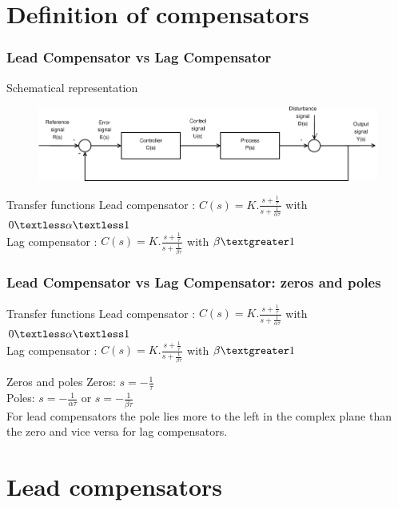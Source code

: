 
\section{Definition of compensators}

\begin{frame}
	\frametitle{Lead Compensator vs Lag Compensator}
	\begin{block}{Schematical representation}
		\begin{figure}
			\centering
			\includegraphics[width=1\linewidth]{Closed-Loop}
		\end{figure}
	\end{block}
	\begin{block}{Transfer functions}
		Lead compensator : 
		$C(s) = K.\frac{s + \frac{1}{\tau}}{s + \frac{1}{\alpha\tau}}$ with $0 \textless  \alpha  \textless  1$ \\
		Lag compensator : 
		$C(s) = K.\frac{s + \frac{1}{\tau}}{s + \frac{1}{\beta\tau}}$ with $\beta  \textgreater  1$
	\end{block}
\end{frame}

\begin{frame}
\frametitle{Lead Compensator vs Lag Compensator: zeros and poles}
\begin{block}{Transfer functions}
	Lead compensator : 
	$C(s) = K.\frac{s + \frac{1}{\tau}}{s + \frac{1}{\alpha\tau}}$ with $0 \textless  \alpha  \textless  1$ \\
	Lag compensator : 
	$C(s) = K.\frac{s + \frac{1}{\tau}}{s + \frac{1}{\beta\tau}}$ with $\beta  \textgreater  1$
\end{block}
\begin{block}{Zeros and poles}
	Zeros: $s = -\frac{1}{\tau}$ \\
	Poles: $s = -\frac{1}{\alpha\tau}$ or $s = -\frac{1}{\beta\tau}$ \\
	For lead compensators the pole lies more to the left in the complex plane than the zero and vice versa for lag compensators.
\end{block}
\end{frame}

\section{Lead compensators}

